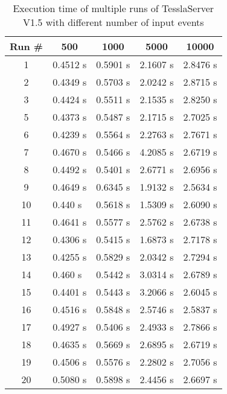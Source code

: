 \begin{table}[!htb]
  \centering
  \caption{Execution time of multiple runs of TesslaServer V1.5 with different number of input events}
  \label{table:tessla_server_v1_5_events_num_events_data}
  \begin{tabular}{cllll}
    Run \# & \multicolumn{1}{c}{500} & \multicolumn{1}{c}{1000} & \multicolumn{1}{c}{5000} & \multicolumn{1}{c}{10000} \\ \hline
   1 &   0.4512 s & 0.5901 s & 2.1607 s & 2.8476 s \\
   2 &   0.4349 s & 0.5703 s & 2.0242 s & 2.8715 s \\
   3 &   0.4424 s & 0.5511 s & 2.1535 s & 2.8250 s \\
   5 &   0.4373 s & 0.5487 s & 2.1715 s & 2.7025 s \\
   6 &   0.4239 s & 0.5564 s & 2.2763 s & 2.7671 s \\
   7 &   0.4670 s & 0.5466 s & 4.2085 s & 2.6719 s \\
   8 &   0.4492 s & 0.5401 s & 2.6771 s & 2.6956 s \\
   9 &   0.4649 s & 0.6345 s & 1.9132 s & 2.5634 s \\
   10 &  0.440 s  & 0.5618 s & 1.5309 s & 2.6090 s \\
   11 &  0.4641 s & 0.5577 s & 2.5762 s & 2.6738 s \\
   12 &  0.4306 s & 0.5415 s & 1.6873 s & 2.7178 s \\
   13 &  0.4255 s & 0.5829 s & 2.0342 s & 2.7294 s \\
   14 &  0.460 s  & 0.5442 s & 3.0314 s & 2.6789 s \\
   15 &  0.4401 s & 0.5443 s & 3.2066 s & 2.6045 s \\
   16 &  0.4516 s & 0.5848 s & 2.5746 s & 2.5837 s \\
   17 &  0.4927 s & 0.5406 s & 2.4933 s & 2.7866 s \\
   18 &  0.4635 s & 0.5669 s & 2.6895 s & 2.6719 s \\
   19 &  0.4506 s & 0.5576 s & 2.2802 s & 2.7056 s \\
   20 &  0.5080 s & 0.5898 s & 2.4456 s & 2.6697 s
  \end{tabular}
\end{table}

